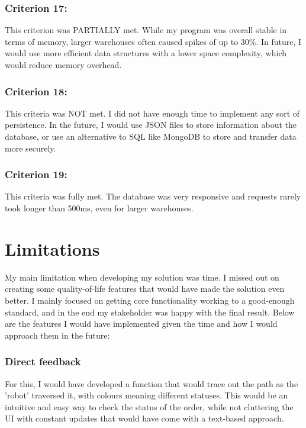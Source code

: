 \subsubsection{Criterion 17:}

This criterion was PARTIALLY met. While my program was overall stable in terms of memory, larger warehouses often caused spikes of up to 30\%. In future, I would use more efficient data structures with a lower space complexity, which would reduce memory overhead.

\subsubsection{Criterion 18:}

This criteria was NOT met. I did not have enough time to implement any sort of persistence. In the future, I would use JSON files to store information about the database, or use an alternative to SQL like MongoDB to store and transfer data more securely.

\subsubsection{Criterion 19:}

This criteria was fully met. The database was very responsive and requests rarely took longer than 500ms, even for larger warehouses.

\section{Limitations}

My main limitation when developing my solution was time. I missed out on creating some quality-of-life features that would have made the solution even better. I mainly focused on getting core functionality working to a good-enough standard, and in the end my stakeholder was happy with the final result. Below are the features I would have implemented given the time and how I would approach them in the future:

\subsubsection{Direct feedback}

For this, I would have developed a function that would trace out the path as the 'robot' traversed it, with colours meaning different statuses. This would be an intuitive and easy way to check the status of the order, while not cluttering the UI with constant updates that would have come with a text-based approach. 

